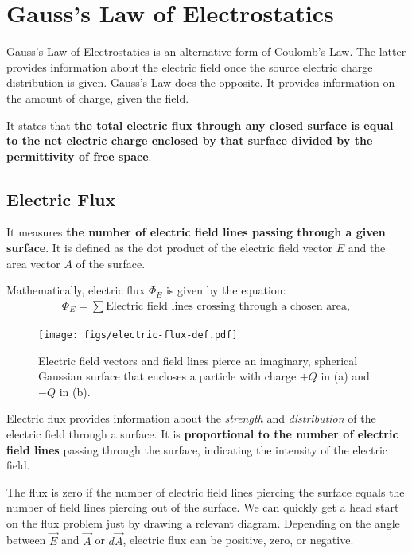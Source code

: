 \documentclass[12pt,b4paper]{article}
\begin{document}
\section{Gauss's Law of Electrostatics}
Gauss's Law of Electrostatics is an alternative form of Coulomb's Law. The latter provides information about the electric field once the source electric charge distribution is given. Gauss's Law does the opposite. It provides information on the amount of charge, given the field. 

It states that \textbf{the total electric flux through any closed surface is equal to the net electric charge enclosed by that surface divided by the permittivity of free space}.
\subsection{Electric Flux}
It measures \textbf{the number of electric field lines passing through a given surface}. It is defined as the dot product of the electric field vector $E$ and the area vector $A$ of the surface.

Mathematically, electric flux $\Phi_E$ is given by the equation:
\begin{align}
    \Phi_E = \sum\text{Electric field lines crossing through a chosen area},
\end{align}
\begin{figure}[H]
    \centering
    \texttt{[image: figs/electric-flux-def.pdf]}
    \caption{Electric field vectors and field lines pierce an imaginary, spherical Gaussian surface that encloses a particle with charge $+Q$ in (a) and $-Q$ in (b).}
    \label{fig:electric-flux-charges}
\end{figure}
Electric flux provides information about the \textit{strength} and \textit{distribution} of the electric field through a surface. It is \textbf{proportional to the number of electric field lines} passing through the surface, indicating the intensity of the electric field.

The flux is zero if the number of electric field lines piercing the surface equals the number of field lines piercing out of the surface. We can quickly get a head start on the flux problem just by drawing a relevant diagram. Depending on the angle between $\vec{E}$ and $\vec{A}$ or $d\vec{A}$, electric flux can be positive, zero, or negative. 
\end{document}
